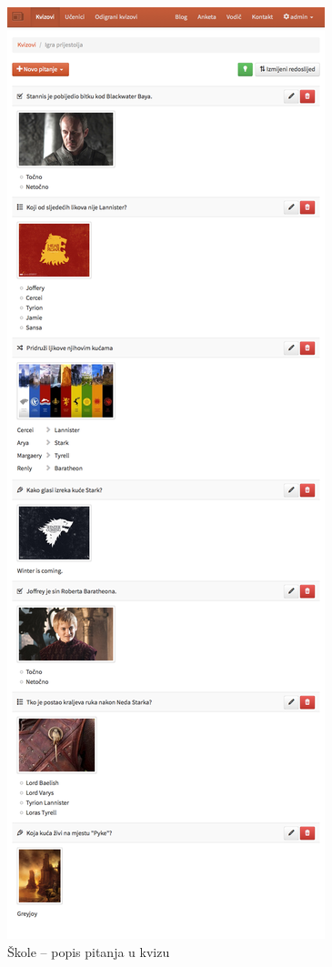 \documentclass{scrreprt}
\begin{document}
\begin{figure}[H]
  \includegraphics[width=\textwidth, clip=true, trim=0 53cm 0 0, fbox]{school/quiz}
  \caption{Škole -- popis pitanja u kvizu}
\end{figure}
\end{document}
